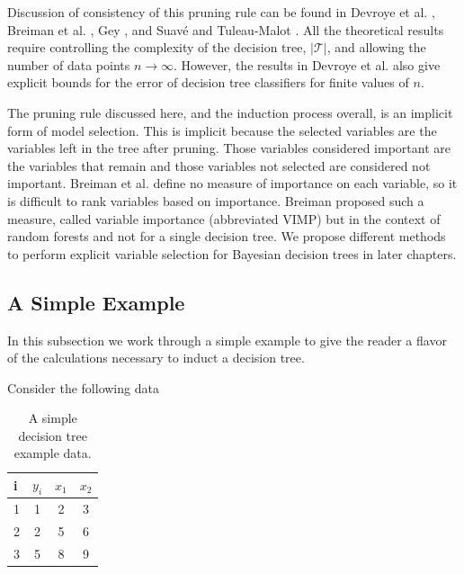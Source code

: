 Discussion of consistency of this pruning rule can be found in Devroye et al. \cite{devroye1996probabilistic}, Breiman et al. \cite{breiman1984classification}, Gey \cite{gey2005model}, and Suav\'{e} and Tuleau-Malot \cite{sauve2011variable}. All the theoretical results require controlling the complexity of the decision tree, $\vert\mathcal{T}\vert$, and allowing the number of data points $n\to\infty$. However, the results in Devroye et al. \cite{devroye1996probabilistic} also give explicit bounds for the error of decision tree classifiers for finite values of $n$. 

The pruning rule discussed here, and the induction process overall, is an implicit form of model selection. This is implicit because the selected variables are the variables left in the tree after pruning. Those variables considered important are the variables that remain and those variables not selected are considered not important. Breiman et al. \cite{breiman1984classification} define no measure of importance on each variable, so it is difficult to rank variables based on importance. Breiman \cite{breiman2001random} proposed such a measure, called variable importance (abbreviated VIMP)  but in the context of random forests and not for a single decision tree. We propose different methods to perform explicit variable selection for Bayesian decision trees in later chapters.   

\subsection{A Simple Example}

In this subsection we work through a simple example to give the reader a flavor of the calculations necessary to induct a decision tree. 

Consider the following data 

\begin{table}[H]
\begin{center}
\begin{tabular}{ l | c | c | c }
  i& $y_i$ & $x_1$ & $x_2$\\
  \hline
  1&1 & 2 & 3 \\
  2&2 & 5 & 6 \\
  3&5 & 8 & 9 \\
\end{tabular}
\caption[A simple decision tree example data]{A simple decision tree example data.}
\label{fig:dtree_firststep}
\end{center}
\end{table}

